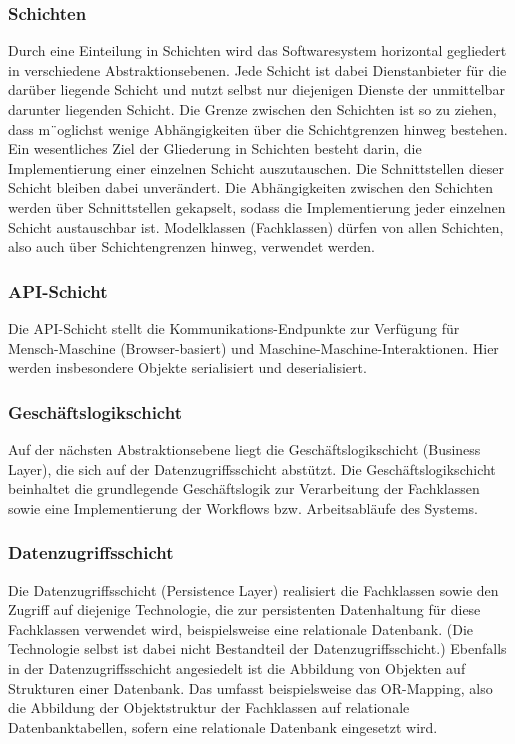 \documentclass[]{report}
\begin{document}
\subsubsection{Schichten}
Durch eine Einteilung in Schichten wird das Softwaresystem horizontal gegliedert in verschiedene Abstraktionsebenen. Jede Schicht ist dabei Dienstanbieter für die darüber liegende Schicht und nutzt selbst nur diejenigen Dienste der unmittelbar darunter liegenden Schicht. Die Grenze zwischen den Schichten ist so zu ziehen, dass m¨oglichst wenige Abhängigkeiten über die Schichtgrenzen hinweg bestehen. Ein wesentliches Ziel der Gliederung in Schichten besteht darin, die
Implementierung einer einzelnen Schicht auszutauschen. Die Schnittstellen dieser Schicht bleiben dabei unverändert. Die Abhängigkeiten zwischen den Schichten werden über Schnittstellen gekapselt, sodass die Implementierung jeder einzelnen Schicht austauschbar ist. Modelklassen (Fachklassen) dürfen von allen Schichten, also auch über Schichtengrenzen hinweg, verwendet werden.

\subsubsection{API-Schicht}
Die API-Schicht stellt die Kommunikations-Endpunkte zur Verfügung für Mensch-Maschine (Browser-basiert) und Maschine-Maschine-Interaktionen. Hier werden insbesondere Objekte serialisiert und deserialisiert.

\subsubsection{Geschäftslogikschicht}
Auf der nächsten Abstraktionsebene liegt die Geschäftslogikschicht (Business Layer), die sich auf der Datenzugriffsschicht abstützt. Die Geschäftslogikschicht beinhaltet die grundlegende Geschäftslogik zur Verarbeitung der Fachklassen sowie eine Implementierung der Workflows bzw. Arbeitsabläufe des Systems.

\subsubsection{Datenzugriffsschicht}
Die Datenzugriffsschicht (Persistence Layer) realisiert die Fachklassen sowie den Zugriff auf diejenige Technologie, die zur persistenten Datenhaltung für diese Fachklassen verwendet wird, beispielsweise eine relationale Datenbank. (Die Technologie selbst ist dabei nicht Bestandteil der Datenzugriffsschicht.) Ebenfalls in der Datenzugriffsschicht angesiedelt ist die Abbildung von Objekten auf Strukturen einer Datenbank. Das umfasst beispielsweise das OR-Mapping, also die Abbildung der Objektstruktur der Fachklassen auf relationale Datenbanktabellen, sofern eine relationale Datenbank eingesetzt wird.
\end{document}
